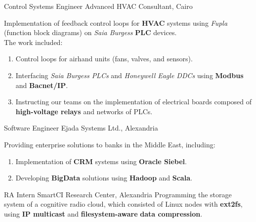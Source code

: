 \documentclass[letterpaper]{twentysecondcv} %
\begin{document}
\begin{twenty}
               {Control Systems Engineer}
               {Advanced HVAC Consultant, Cairo}
               {Implementation of feedback control loops for \textbf{HVAC} systems using \textit{Fupla} (function block diagrams) on
                \textit{Saia Burgess} \textbf{PLC} devices.\\ The work included:
                \begin{enumerate}
                    \item{Control loops for airhand units (fans, valves, and sensors).}
                    \item{Interfacing \textit{Saia Burgess PLCs} and \textit{Honeywell Eagle DDCs} using
                          \textbf{Modbus} and \textbf{Bacnet/IP}.}
                    \item{Instructing our teams on the implementation of electrical boards composed of
                          \textbf{high-voltage relays} and networks of PLCs.}
                \end{enumerate}
               }

               {Software Engineer}
               {Ejada Systems Ltd., Alexandria}
               {Providing enterprise solutions to banks in the Middle East, including:
                \begin{enumerate}
                    \item Implementation of \textbf{CRM} systems using \textbf{Oracle Siebel}.
                    \item Developing \textbf{BigData} solutions using
                          \textbf{Hadoop} and \textbf{Scala}.
                \end{enumerate}}

               {RA Intern}
               {SmartCI Research Center, Alexandria}
               {Programming the storage system of a cognitive radio cloud, which consisted of
                Linux nodes with \textbf{ext2fs}, using \textbf{IP multicast} and \textbf{filesystem-aware}
                \textbf{data compression}.}

\end{twenty}
\end{document}
